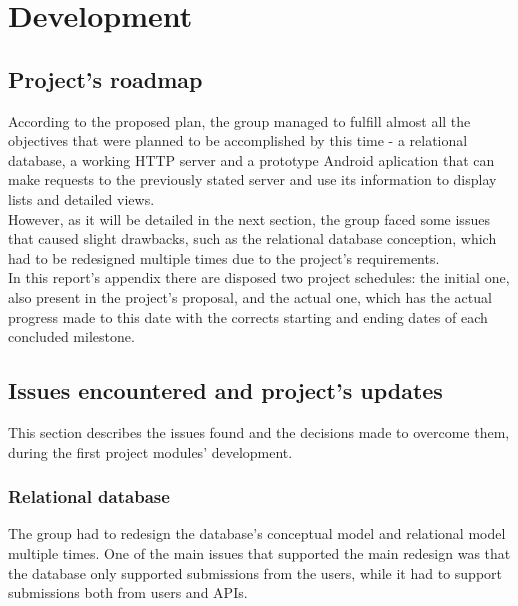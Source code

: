%
%
\chapter{Development}
    
	\section{Project's roadmap}

    According to the proposed plan, the group managed to fulfill almost all the objectives
    that were planned to be accomplished by this time - a relational database, a working HTTP server
    and a prototype Android aplication that can make requests to the previously stated server and 
    use its information to display lists and detailed views.\\

    However, as it will be detailed in the next section, the group faced some issues that caused slight
    drawbacks, such as the relational database conception, which had to be redesigned multiple
    times due to the project's requirements.\\

    In this report's appendix there are disposed two project schedules: the initial one, also present in the
    project's proposal, and the actual one, which has the actual progress made to this date with the corrects starting
    and ending dates of each concluded milestone.


    \section{Issues encountered and project's updates}

    This section describes the issues found and the decisions made
    to overcome them, during the first project modules' development.
    
    \subsection{Relational database}

    The group had to redesign the database's conceptual model and relational model multiple times.
    One of the main issues that supported the main redesign was that the database 
    only supported submissions from the users, while it had to support submissions both from users and APIs.\\

